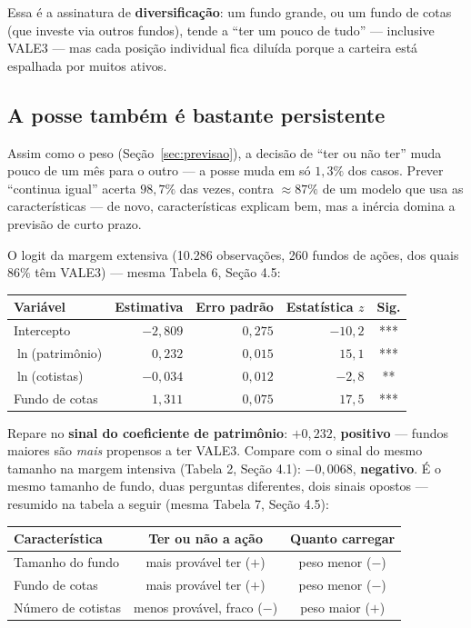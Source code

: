 \documentclass[11pt,a4paper]{article}
\begin{document}
Essa é a assinatura de \textbf{diversificação}: um fundo grande, ou um fundo de cotas (que investe
via outros fundos), tende a ``ter um pouco de tudo'' --- inclusive VALE3 --- mas cada posição
individual fica diluída porque a carteira está espalhada por muitos ativos.

\subsection{A posse também é bastante persistente}

Assim como o peso (Seção~\ref{sec:previsao}), a decisão de ``ter ou não ter'' muda pouco de um
mês para o outro --- a posse muda em só $1{,}3\%$ dos casos. Prever ``continua igual'' acerta
$98{,}7\%$ das vezes, contra $\approx87\%$ de um modelo que usa as características --- de novo,
características explicam bem, mas a inércia domina a previsão de curto prazo.

O logit da margem extensiva (10.286 observações, 260 fundos de ações, dos quais $86\%$ têm
VALE3) --- mesma Tabela 6, Seção 4.5:

\begin{center}\small
\begin{tabular}{@{}lrrrc@{}}
\toprule
Variável & Estimativa & Erro padrão & Estatística $z$ & Sig. \\
\midrule
Intercepto        & $-2{,}809$ & $0{,}275$ & $-10{,}2$ & *** \\
$\ln$(patrimônio) & $0{,}232$  & $0{,}015$ & $15{,}1$  & *** \\
$\ln$(cotistas)   & $-0{,}034$ & $0{,}012$ & $-2{,}8$  & ** \\
Fundo de cotas    & $1{,}311$  & $0{,}075$ & $17{,}5$  & *** \\
\bottomrule
\end{tabular}
\end{center}

Repare no \textbf{sinal do coeficiente de patrimônio}: $+0{,}232$, \textbf{positivo} --- fundos
maiores são \emph{mais} propensos a ter VALE3. Compare com o sinal do mesmo tamanho na margem
intensiva (Tabela 2, Seção 4.1): $-0{,}0068$, \textbf{negativo}. É o mesmo tamanho de fundo, duas
perguntas diferentes, dois sinais opostos --- resumido na tabela a seguir (mesma Tabela 7, Seção
4.5):

\begin{center}\small
\begin{tabular}{@{}lcc@{}}
\toprule
Característica & Ter ou não a ação & Quanto carregar \\
\midrule
Tamanho do fundo   & mais provável ter ($+$) & peso menor ($-$) \\
Fundo de cotas     & mais provável ter ($+$) & peso menor ($-$) \\
Número de cotistas & menos provável, fraco ($-$) & peso maior ($+$) \\
\bottomrule
\end{tabular}
\end{center}
\end{document}
